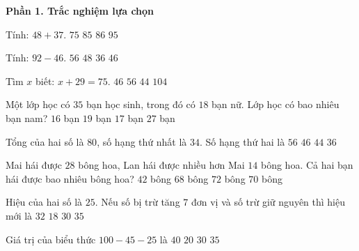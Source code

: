\textbf{Phần 1. Trắc nghiệm lựa chọn}

\begin{ex} %
Tính: $48 + 37$.
\choice
{$75$}
{\True $85$}
{$86$}
{$95$}
\end{ex}

\begin{ex} %
Tính: $92 - 46$.
\choice
{$56$}
{$48$}
{$36$}
{\True $46$}
\end{ex}

\begin{ex} %
Tìm $x$ biết: $x + 29 = 75$.
\choice
{\True $46$}
{$56$}
{$44$}
{$104$}
\end{ex}

\begin{ex} %
Một lớp học có $35$ bạn học sinh, trong đó có $18$ bạn nữ. Lớp học có bao nhiêu bạn nam?
\choice
{$16$ bạn}
{$19$ bạn}
{\True $17$ bạn}
{$27$ bạn}
\end{ex}

\begin{ex} %
Tổng của hai số là $80$, số hạng thứ nhất là $34$. Số hạng thứ hai là
\choice
{$56$}
{\True $46$}
{$44$}
{$36$}
\end{ex}

\begin{ex} %
Mai hái được $28$ bông hoa, Lan hái được nhiều hơn Mai $14$ bông hoa. Cả hai bạn hái được bao nhiêu bông hoa?
\choice
{$42$ bông}
{$68$ bông}
{$72$ bông}
{\True $70$ bông}
\end{ex}

\begin{ex} %
Hiệu của hai số là $25$. Nếu số bị trừ tăng $7$ đơn vị và số trừ giữ nguyên thì hiệu mới là
\choice
{\True $32$}
{$18$}
{$30$}
{$35$}
\end{ex}

\begin{ex} %
Giá trị của biểu thức $100 - 45 - 25$ là
\choice
{$40$}
{$20$}
{\True $30$}
{$35$}
\end{ex}

